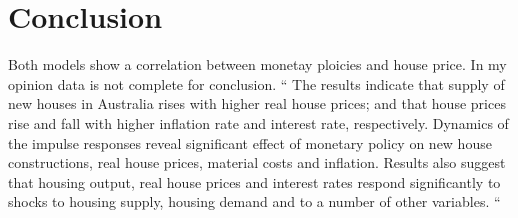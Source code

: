 \section{Conclusion}
Both models show a correlation between monetay ploicies and house price. In my opinion data is not complete for conclusion. 
``
The results indicate that supply of new
houses in Australia rises with higher real house prices; and that house prices rise
and fall with higher inflation rate and interest rate, respectively. Dynamics of the
impulse responses reveal significant effect of monetary policy on new house
constructions, real house prices, material costs and inflation. Results also
suggest that housing output, real house prices and interest rates respond
significantly to shocks to housing supply, housing demand and to a number of
other variables.
``